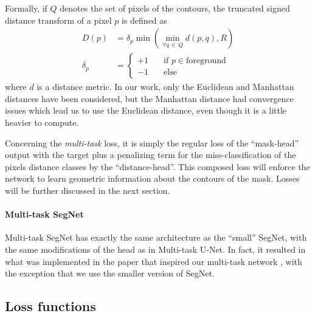 \documentclass[twocolumn,superscriptaddress,aps,nofootinbib]{revtex4-1}
\begin{document}
Formally, if $Q$ denotes the set of pixels of the contours, the truncated signed distance transform of a pixel $p$ is defined as
\begin{align}
    D(p) & = \delta_p \min \left( \min_{\forall q \,\in\, Q} d(p, q), R \right) \\
    \delta_p & = \begin{cases}
        +1 \quad & \text{if } p \in \text{foreground} \\
        -1 & \text{else}
    \end{cases}
\end{align}
where $d$ is a distance metric. In our work, only the Euclidean and Manhattan distances have been considered, but the Manhattan distance had convergence issues which lead us to use the Euclidean distance, even though it is a little heavier to compute.

Concerning the \emph{multi-task} loss, it is simply the regular loss of the \enquote{mask-head} output with the target plus a penalizing term for the miss-classification of the pixels distance classes by the \enquote{distance-head}. This composed loss will enforce the network to learn geometric information about the contours of the mask. Losses will be further discussed in the next section.

\vspace{1em}

\paragraph{Multi-task SegNet}

Multi-task SegNet has exactly the same architecture as the \enquote{small} SegNet, with the same modifications of the head as in Multi-task U-Net. In fact, it resulted in what was implemented in the paper that inspired our multi-task network \cite{bischke2019multi}, with the exception that we use the smaller version of SegNet.

\subsection{Loss functions}
\label{subsec:losses}
\end{document}
